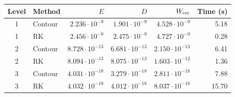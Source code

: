\begin{tabular}{clrrrr}
\toprule
Level & Method & $E$ & $D$ & $W_{\rm err}$ & Time (s)\\
\midrule
1 & Contour & $2.236\cdot10^{-9}$ & $1.901\cdot10^{-9}$ & $4.528\cdot10^{-9}$ & 5.18\\
1 & RK & $2.456\cdot10^{-9}$ & $2.475\cdot10^{-9}$ & $4.727\cdot10^{-9}$ & 0.28\\
2 & Contour & $8.728\cdot10^{-13}$ & $6.681\cdot10^{-13}$ & $2.150\cdot10^{-13}$ & 6.41\\
2 & RK & $8.094\cdot10^{-13}$ & $8.075\cdot10^{-13}$ & $1.603\cdot10^{-12}$ & 1.36\\
3 & Contour & $4.031\cdot10^{-18}$ & $3.279\cdot10^{-18}$ & $2.811\cdot10^{-18}$ & 7.88\\
3 & RK & $4.032\cdot10^{-18}$ & $4.012\cdot10^{-18}$ & $8.037\cdot10^{-18}$ & 15.70\\
\bottomrule
\end{tabular}
